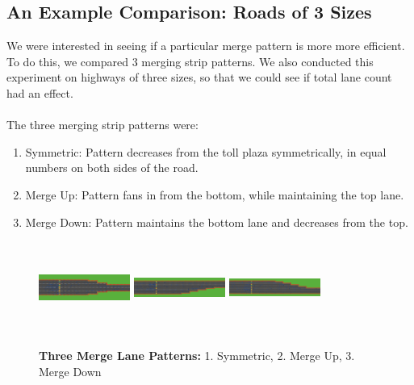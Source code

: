 \documentclass{article}
\begin{document}
\subsection{An Example Comparison: Roads of 3 Sizes}

We were interested in seeing if a particular merge pattern is more more efficient. To do this, we compared 3 merging strip patterns. We also conducted this experiment on highways of three sizes, so that we could see if total lane count had an effect. \\ \\
The three merging strip patterns were: \\
\begin{enumerate}
\item Symmetric: Pattern decreases from the toll plaza symmetrically, in equal numbers on both sides of the road.
\item Merge Up: Pattern fans in from the bottom, while maintaining the top lane.
\item Merge Down: Pattern maintains the bottom lane and decreases from the top.
\end{enumerate}

\begin{figure}[H]
    \centering
    \includegraphics[width=3cm, height=3cm]{3l4bs}
   \includegraphics[width=3cm, height=3cm]{3l4bmu}
\includegraphics[width=3cm, height=3cm]{3l4bmd}
   \caption{\textbf{Three Merge Lane Patterns:} 1. Symmetric, 2. Merge Up, 3. Merge Down}
\end{figure}
\end{document}
